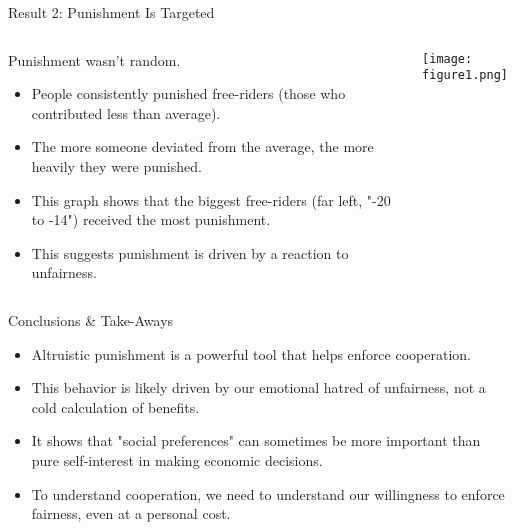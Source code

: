 \documentclass{beamer}
\begin{document}
\begin{frame}{Result 2: Punishment Is Targeted}
    \begin{columns}[c]
        \begin{column}{.5\textwidth}
            Punishment wasn't random.
            \begin{itemize}
                \item<1-> People consistently punished free-riders (those who contributed less than average).
                \pause
                \item<2-> The more someone deviated from the average, the more heavily they were punished.
                \pause
                \item<3-> This graph shows that the biggest free-riders (far left, "-20 to -14") received the most punishment.
                \pause
                \item<4-> This suggests punishment is driven by a reaction to unfairness.
            \end{itemize}
        \end{column}
        \begin{column}{.5\textwidth}
            \begin{center}
            \texttt{[image: figure1.png]}
            \end{center}
        \end{column}
    \end{columns}
\end{frame}

\begin{frame}{Conclusions \& Take-Aways}
    \begin{itemize}
        \item<1-> Altruistic punishment is a powerful tool that helps enforce cooperation.
        \pause
        \item<2-> This behavior is likely driven by our emotional hatred of unfairness, not a cold calculation of benefits.
        \pause
        \item<3-> It shows that "social preferences" can sometimes be more important than pure self-interest in making economic decisions.
        \pause
        \item<4-> To understand cooperation, we need to understand our willingness to enforce fairness, even at a personal cost.
    \end{itemize}
\end{frame}
\end{document}
